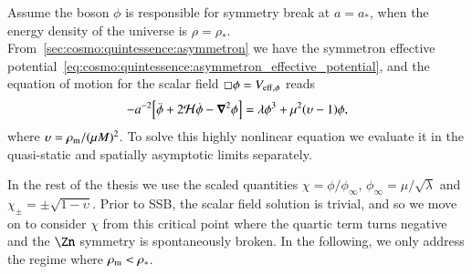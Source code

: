 


\newcommand{\eqregimenum}[1]{{\footnotesize{\textsf{\textbf{({#1})}}}}}
\newcommand{\brchi}{\breve{\chi}}


Assume the boson $\phi$ is responsible for symmetry break at $a=a_\ast$, when the energy density of the universe is $\rho=\rho_\ast$. %
From~\cref{sec:cosmo:quintessence:asymmetron} we have the symmetron effective potential~\cref{eq:cosmo:quintessence:asymmetron_effective_potential}, and the equation of motion for the scalar field $\sq \phi=V_{\mathrm{eff},\phi}$ reads
\begin{equation}
    -a^{-2} {\left[  \ddot{\phi} + 2\mathcal{H} \dot{\phi} - \boldsymbol{\nabla}^2\phi  \right]} = \lambda \phi^3 +\mu^2 {\left(  \upsilon-1 \right)}\phi,
\end{equation}
where $\upsilon=\rho_\mathrm{m}/(\mu M)^2$. %
To solve this highly nonlinear equation we evaluate it in the quasi-static and spatially asymptotic limits separately.


In the rest of the thesis we use the scaled quantities $\chi=\phi/\phi_\infty$, $\phi_\infty=\mu/\sqrt{\lambda}$ and $\chi_\pm=\pm\sqrt{1-\upsilon}$. Prior to SSB, the scalar field solution is trivial, and so we move on to consider $\chi$ from this critical point where the quartic term turns negative and the $\Zn$ symmetry is spontaneously broken. In the following, we only address the regime where $\rho_\mathrm{m}< \rho_\ast$.













